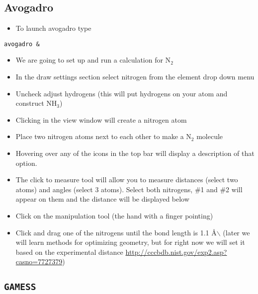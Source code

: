 \documentclass[11pt]{article}
\begin{document}
\subsection{Avogadro}
\label{sec:org619d8b7}

\begin{itemize}
\item To launch avogadro type
\end{itemize}

\begin{verbatim}
avogadro &
\end{verbatim}

\begin{itemize}
\item We are going to set up and run a calculation for N\(_{\text{2}}\)

\item In the draw settings section select nitrogen from the element drop down menu

\item Uncheck adjust hydrogens (this will put hydrogens on your atom and construct NH\(_{\text{3}}\))

\item Clicking in the view window will create a nitrogen atom

\item Place two nitrogen atoms next to each other to make a N\(_{\text{2}}\) molecule

\item Hovering over any of the icons in the top bar will display a description of that option.

\item The click to measure tool will allow you to measure distances (select two atoms) and angles (select 3 atoms). Select both nitrogens, \#1 and \#2 will appear on them and the distance will be displayed below

\item Click on the manipulation tool (the hand with a finger pointing)

\item Click and drag one of the nitrogens until the bond length is 1.1 \AA{}$\backslash$ (later we will learn methods for optimizing geometry, but for right now we will set it based on the experimental distance \url{http://cccbdb.nist.gov/exp2.asp?casno=7727379})
\end{itemize}

\subsection{\texttt{GAMESS}}
\label{sec:orgc66b4b1}
\end{document}
